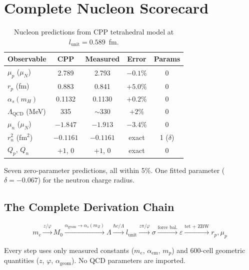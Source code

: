 \documentclass[12pt,a4paper]{article}
\begin{document}
\section{Complete Nucleon Scorecard}
\label{sec:scorecard}

\begin{table}[h]
\centering
\caption{Nucleon predictions from CPP tetrahedral model at $l_{\mathrm{unit}} = 0.589$~fm.}
\label{tab:scorecard}
\begin{tabular}{lcccc}
\toprule
Observable & CPP & Measured & Error & Params \\
\midrule
$\mu_p$ ($\mu_N$) & 2.789 & 2.793 & $-0.1\%$ & 0 \\
$r_p$ (fm) & 0.883 & 0.841 & $+5.0\%$ & 0 \\
$\alpha_s(m_H)$ & 0.1132 & 0.1130 & $+0.2\%$ & 0 \\
$\Lambda_{\mathrm{QCD}}$ (MeV) & 335 & $\sim$330 & $+2\%$ & 0 \\
$\mu_n$ ($\mu_N$) & $-1.847$ & $-1.913$ & $-3.4\%$ & 0 \\
$r_n^2$ (fm$^2$) & $-0.1161$ & $-0.1161$ & exact & 1 ($\delta$) \\
$Q_p$, $Q_n$ & $+1$, $0$ & $+1$, $0$ & exact & 0 \\
\bottomrule
\end{tabular}
\end{table}

Seven zero-parameter predictions, all within 5\%. One fitted parameter ($\delta = -0.067$) for the neutron charge radius.

\subsection{The Complete Derivation Chain}

\begin{equation*}
m_e \xrightarrow{z/\varphi} M_0 \xrightarrow{\alpha_{\mathrm{geom}} \to \alpha_s(m_Z)} \Lambda \xrightarrow{\hbar c/\Lambda} l_{\mathrm{unit}} \xrightarrow{z\pi/\varphi} \sigma \xrightarrow{\text{force bal.}} \varepsilon \xrightarrow{\text{tet + ZBW}} r_p, \mu_p
\end{equation*}

Every step uses only measured constants ($m_e$, $\alpha_{\mathrm{em}}$, $m_p$) and 600-cell geometric quantities ($z$, $\varphi$, $\alpha_{\mathrm{geom}}$). No QCD parameters are imported.
\end{document}
